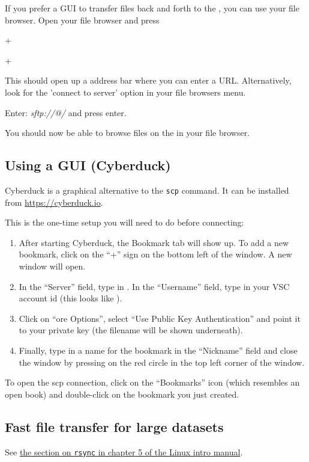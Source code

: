   If you prefer a GUI to transfer files back and forth to the \hpc, you can use your file browser.
  Open your file browser  and press

  \iflinux
     + 
  \fi

  \ifmac
     + 
  \fi

  This should open up a address bar where you can enter a URL. Alternatively, look for the 'connect to server' option in your file browsers menu.

  Enter: \emph{sftp://\userid{}@\loginnode/} and press enter.

  You should now be able to browse files on the \hpc in your file browser.
\fi

\ifmac
  \subsection{Using a GUI (Cyberduck)}

  Cyberduck is a graphical alternative to the \lstinline|scp| command. It can be installed
  from \url{https://cyberduck.io}.

  This is the one-time setup you will need to do before connecting:

  \begin{enumerate}
      \item After starting Cyberduck, the Bookmark tab will show up. To add a new
        bookmark, click on the ``+'' sign on the bottom left of the window. A new window will open.
      \item In the ``Server'' field, type in \texttt{\loginnode}. In the ``Username'' field,
        type in your VSC account id (this looks like \texttt{\userid}).
      \item Click on ``ore Options'', select ``Use Public Key Authentication'' and point
        it to your private key (the filename will be shown underneath).
      \item Finally, type in a name for the bookmark in the ``Nickname'' field and
        close the window by pressing on the red circle in the top left corner of the window.
  \end{enumerate}

  To open the scp connection, click on the ``Bookmarks'' icon (which resembles an
  open book) and double-click on the bookmark you just created.

\fi

\subsection{Fast file transfer for large datasets}

See \href{\LinuxManualURL#sec:rsync}{the section on \texttt{rsync} in chapter 5 of the Linux intro manual}.
